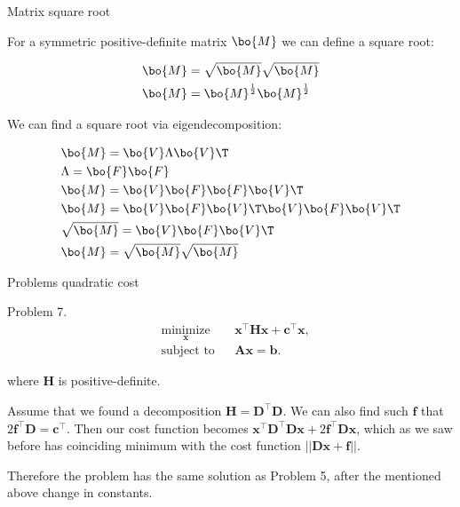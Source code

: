 \documentclass{beamer}
\begin{document}
\begin{frame}{Matrix square root}
	\begin{flushleft}
		
		For a symmetric positive-definite matrix $\bo{M}$ we can define a square root:
		
		\begin{align}
			\bo{M} &= \sqrt{\bo{M} } \sqrt{\bo{M} }
			\\
			\bo{M} &= \bo{M}^\frac{1}{2} \bo{M}^\frac{1}{2}
		\end{align}
		
		We can find a square root via eigendecomposition:
		
		\begin{align}
			& \bo{M} = \bo{V} \Lambda \bo{V}\T 
			\\
			&  \Lambda =  \bo{F} \bo{F}
			\\
			& \bo{M} = \bo{V} \bo{F} \bo{F} \bo{V}\T 
			\\
			& \bo{M} = \bo{V} \bo{F} \bo{V}\T\bo{V}  \bo{F} \bo{V}\T 
			\\
			& \sqrt{\bo{M} }  = \bo{V} \bo{F} \bo{V}\T
			\\
			&\bo{M} = \sqrt{\bo{M} } \sqrt{\bo{M} } 
		\end{align}
		
		
		
	\end{flushleft}
\end{frame}




\begin{frame}{Problems quadratic cost}
	\begin{flushleft}
		
		Problem 7. 
		\begin{equation}
			\begin{aligned}
				& \underset{\mathbf{x}}{\text{minimize}}
				& & \mathbf{x}^\top \mathbf{H} \mathbf{x} + \mathbf{c}^\top\mathbf{x}, \\
				& \text{subject to}
				& & \mathbf{A} \mathbf{x} = \mathbf{b}.
			\end{aligned}
		\end{equation}
		
		where $\mathbf{H}$ is positive-definite.
		
		\bigskip
		
		Assume that we found a decomposition $\mathbf{H} = \mathbf{D}^\top\mathbf{D}$. We can also find such $\mathbf{f}$ that $2\mathbf{f}^\top\mathbf{D} = \mathbf{c}^\top$. Then our cost function becomes $\mathbf{x}^\top \mathbf{D}^\top\mathbf{D} \mathbf{x} + 2\mathbf{f}^\top\mathbf{D}\mathbf{x}$, which as we saw before has coinciding minimum with the cost function $||\mathbf{D}\mathbf{x} + \mathbf{f}||$.
		
		\bigskip
		
		Therefore the problem has the same solution as Problem 5, after the mentioned above change in constants.
		
	\end{flushleft}
\end{frame}
\end{document}
